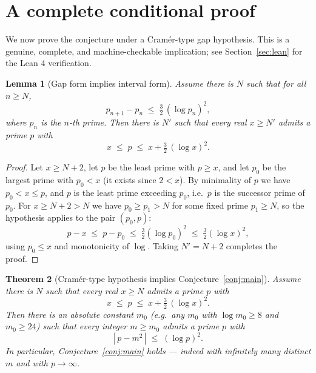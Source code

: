 \documentclass[11pt]{article}
\newtheorem{theorem}{Theorem}[section]
\newtheorem{lemma}[theorem]{Lemma}
\theoremstyle{definition}
\theoremstyle{remark}
\begin{document}
\section{A complete conditional proof}

We now prove the conjecture under a Cram\'er-type gap hypothesis. This is a genuine, complete, and machine-checkable implication; see Section~\ref{sec:lean} for the Lean 4 verification.

\begin{lemma}[Gap form implies interval form]\label{lem:gaptointerval}
Assume there is $N$ such that for all $n \ge N$,
\[
p_{n+1} - p_n \;\le\; \tfrac{3}{2}\,(\log p_n)^2 ,
\]
where $p_n$ is the $n$-th prime. Then there is $N'$ such that every real $x \ge N'$ admits a prime $p$ with
\[
x \;\le\; p \;\le\; x + \tfrac{3}{2}\,(\log x)^2 .
\]
\end{lemma}

\begin{proof}
Let $x \ge N+2$, let $p$ be the least prime with $p \ge x$, and let $p_0$ be the largest prime with $p_0 < x$ (it exists since $2 < x$). By minimality of $p$ we have $p_0 < x \le p$, and $p$ is the least prime exceeding $p_0$, i.e.\ $p$ is the successor prime of $p_0$. For $x \ge N + 2 > N$ we have $p_0 \ge p_1 > N$ for some fixed prime $p_1 \ge N$, so the hypothesis applies to the pair $(p_0, p)$:
\[
p - x \;\le\; p - p_0 \;\le\; \tfrac32 (\log p_0)^2 \;\le\; \tfrac32 (\log x)^2 ,
\]
using $p_0 \le x$ and monotonicity of $\log$. Taking $N' = N+2$ completes the proof.
\end{proof}

\begin{theorem}[Cramér-type hypothesis implies Conjecture~\ref{conj:main}]\label{thm:cramer}
Assume there is $N$ such that every real $x \ge N$ admits a prime $p$ with
\begin{equation}\label{eq:H}
x \;\le\; p \;\le\; x + \tfrac{3}{2}\,(\log x)^2 .
\end{equation}
Then there is an absolute constant $m_0$ (e.g.\ any $m_0$ with $\log m_0 \ge 8$ and $m_0 \ge 24$) such that \emph{every} integer $m \ge m_0$ admits a prime $p$ with
\[
|\,p - m^2\,| \;\le\; (\log p)^2 .
\]
In particular, Conjecture~\ref{conj:main} holds --- indeed with infinitely many distinct $m$ and with $p \to \infty$.
\end{theorem}
\end{document}
